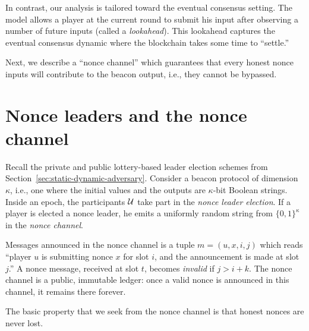         In contrast, our analysis is tailored toward the eventual consensus setting.
        The model allows a player at the current round to 
        submit his input after observing a number of future inputs 
        (called a \emph{lookahead}). 
        This lookahead captures the eventual consensus dynamic 
        where the blockchain takes some time to ``settle.'' 






Next, we describe a ``nonce channel'' which guarantees that 
every honest nonce inputs will contribute to the beacon output, 
i.e., they cannot be bypassed. 


\section{Nonce leaders and the nonce channel}
Recall the private and public lottery-based leader election schemes 
from Section~\ref{sec:static-dynamic-adversary}. 
Consider a beacon protocol of dimension $\kappa$, 
i.e., one where the initial values and the outputs are $\kappa$-bit Boolean strings. 
Inside an epoch, 
the participants $\mathcal{U}$ take part in the \emph{nonce leader election}. 
If a player is elected a nonce leader, 
he emits a uniformly random string from $\{0,1\}^\kappa$  
in the \emph{nonce channel}. 

\begin{definition}\label{def:nonce-channel}
  Messages announced in the nonce channel is a tuple $m = (u, x, i, j)$ 
  which reads ``player $u$ is submitting nonce $x$ for slot $i$, 
  and the announcement is made at slot $j$.''
  A nonce message, received at slot $t$, becomes \emph{invalid} 
  if $j > i + k$.
  The nonce channel is a public, immutable ledger: 
  once a valid nonce is announced in this channel, 
  it remains there forever. 
\end{definition}
\noindent
The basic property that we seek from the nonce channel is that 
honest nonces are never lost. 



